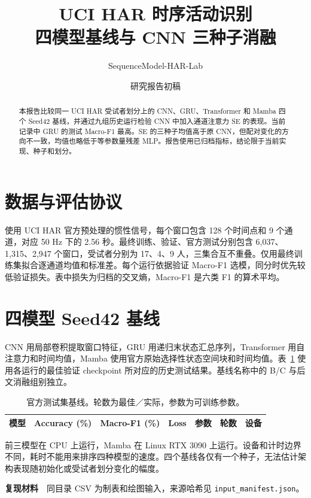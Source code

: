\documentclass[UTF8,a4paper,11pt,fontset=none]{ctexart}
\title{\textbf{UCI HAR 时序活动识别}\\[4pt]\large 四模型基线与 CNN 三种子消融}
\author{SequenceModel-HAR-Lab}
\date{研究报告初稿}
\begin{document}
\maketitle

\begin{abstract}
本报告比较同一 UCI HAR 受试者划分上的 CNN、GRU、Transformer 和 Mamba 四个 Seed42 基线，并通过九组历史运行检验 CNN 中加入通道注意力 SE 的表现。当前记录中 GRU 的测试 Macro-F1 最高。SE 的三种子均值高于原 CNN，但配对变化的方向不一致，均值也略低于等参数量残差 MLP。报告使用已归档指标，结论限于当前实现、种子和划分。
\end{abstract}

\section{数据与评估协议}
使用 UCI HAR 官方预处理的惯性信号，每个窗口包含 128 个时间点和 9 个通道，对应 50 Hz 下的 2.56 秒。最终训练、验证、官方测试分别包含 6,037、1,315、2,947 个窗口，受试者分别为 17、4、9 人，三集合互不重叠。仅用最终训练集拟合逐通道均值和标准差。每个运行依据验证 Macro-F1 选模，同分时优先较低验证损失。表中损失为归档的交叉熵，Macro-F1 是六类 F1 的算术平均。

\section{四模型 Seed42 基线}
CNN 用局部卷积提取窗口特征，GRU 用递归末状态汇总序列，Transformer 用自注意力和时间均值，Mamba 使用官方原始选择性状态空间块和时间均值。表~\ref{tab:baselines} 使用各运行的最佳验证 checkpoint 所对应的历史测试结果。基线名称中的 B/C 与后文消融组别独立。

\begin{table}[ht!]
\centering
\caption{官方测试集基线。轮数为最佳／实际，参数为可训练参数。}
\label{tab:baselines}
\small
\begin{tabular}{lrrrrrl}
\toprule
模型 & Accuracy (\%) & Macro-F1 (\%) & Loss & 参数 & 轮数 & 设备 \\
\midrule

\end{tabular}
\end{table}

前三模型在 CPU 上运行，Mamba 在 Linux RTX 3090 上运行。设备和计时边界不同，耗时不能用来排序四种模型的速度。四个基线各仅有一个种子，无法估计架构表现随初始化或受试者划分变化的幅度。

\noindent\textbf{复现材料}　同目录 CSV 为制表和绘图输入，来源哈希见 \texttt{input\_manifest.json}。
\end{document}
